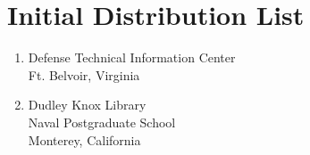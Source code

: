 \documentclass[twoside,index]{npsreport}
\begin{document}
\NPSend         


\chapter*{Initial Distribution List}
\singlespace
\begin{enumerate}
\item Defense Technical Information Center\\Ft. Belvoir, Virginia
\item Dudley Knox Library\\Naval Postgraduate School\\Monterey, California

%
%

\end{enumerate}
\end{document}
